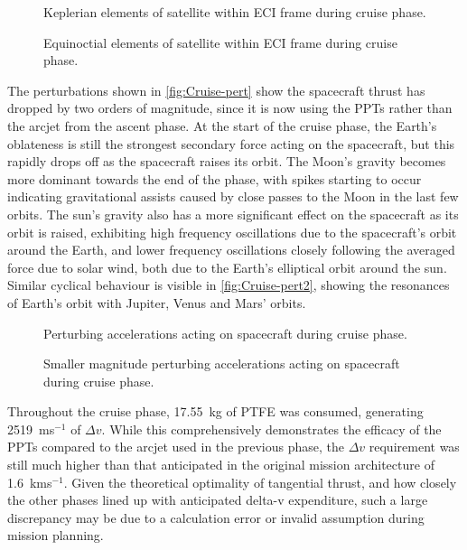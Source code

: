 \begin{figure}
\centering
\def\svgwidth{\figurewidth}

\caption{Keplerian elements of satellite within ECI frame during cruise phase.} \label{fig:Cruise-kep}
\end{figure}

\begin{figure}
\centering
\def\svgwidth{\figurewidth}

\caption{Equinoctial elements of satellite within ECI frame during cruise phase.} \label{fig:Cruise-mee}
\end{figure}

The perturbations shown in \autoref{fig:Cruise-pert} show the spacecraft thrust has dropped by two orders of magnitude, since it is now using the PPTs rather than the arcjet from the ascent phase. At the start of the cruise phase, the Earth's oblateness is still the strongest secondary force acting on the spacecraft, but this rapidly drops off as the spacecraft raises its orbit. The Moon's gravity becomes more dominant towards the end of the phase, with spikes starting to occur indicating gravitational assists caused by close passes to the Moon in the last few orbits. The sun's gravity also has a more significant effect on the spacecraft as its orbit is raised, exhibiting high frequency oscillations due to the spacecraft's orbit around the Earth, and lower frequency oscillations closely following the averaged force due to solar wind, both due to the Earth's elliptical orbit around the sun. Similar cyclical behaviour is visible in \autoref{fig:Cruise-pert2}, showing the resonances of Earth's orbit with Jupiter, Venus and Mars' orbits.

\begin{subfigures}
\begin{figure}
\centering
\def\svgwidth{\figurewidth}

\caption{Perturbing accelerations acting on spacecraft during cruise phase.} \label{fig:Cruise-pert}
\end{figure}

\begin{figure}
\centering
\def\svgwidth{\figurewidth}

\caption{Smaller magnitude perturbing accelerations acting on spacecraft during cruise phase.} \label{fig:Cruise-pert2}
\end{figure}
\end{subfigures}

Throughout the cruise phase, 17.55~kg of PTFE was consumed, generating 2519~ms$^{-1}$ of $\Delta v$. While this comprehensively demonstrates the efficacy of the PPTs compared to the arcjet used in the previous phase, the $\Delta v$ requirement was still much higher than that anticipated in the original mission architecture of 1.6~kms$^{-1}$. Given the theoretical optimality of tangential thrust, and how closely the other phases lined up with anticipated delta-v expenditure, such a large discrepancy may be due to a calculation error or invalid assumption during mission planning.


